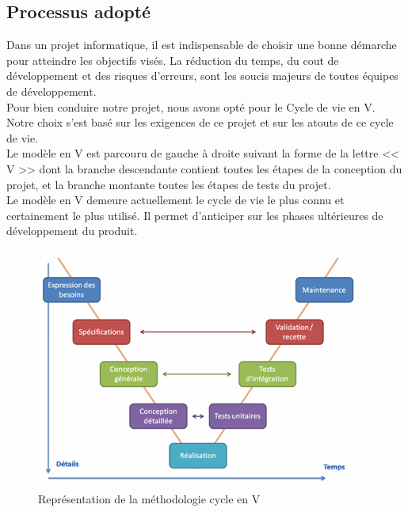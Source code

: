 \documentclass[12pt]{report}
\begin{document}
\subsection{Processus adopté}
Dans un projet informatique, il est indispensable de choisir une bonne démarche pour atteindre les objectifs visés. La réduction du temps, du cout de développement et des risques d'erreurs, sont les soucis majeurs de toutes équipes de développement.\\[9pt]
Pour bien conduire notre projet, nous avons opté pour le Cycle de vie en V. Notre choix s'est basé sur les exigences de ce projet et sur les atouts de ce cycle de vie.\\[9pt]
Le modèle en V est parcouru de gauche à droite suivant la forme de la lettre << V >> dont la branche descendante contient toutes les étapes de la conception du projet, et la branche montante toutes les étapes de tests du projet.\\[9pt]
Le modèle en V demeure actuellement le cycle de vie le plus connu et certainement le plus utilisé. Il permet d'anticiper sur les phases ultérieures de développement du produit.
\begin{figure}[H]
  \centering
  \includegraphics[scale=1]{v}
  \caption{Représentation de la méthodologie cycle en V}
  \label{fig:votre-label}
\end{figure}
\end{document}
